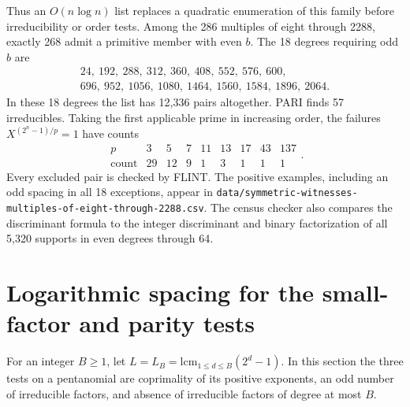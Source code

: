 \documentclass[11pt]{article}
\begin{document}
Thus an \(O(n\log n)\) list replaces a quadratic enumeration of this
family before irreducibility or order tests. Among the 286 multiples
of eight through 2288, exactly 268 admit a primitive member with even
\(b\). The 18 degrees requiring odd \(b\) are
\[
\begin{gathered}
24,\ 192,\ 288,\ 312,\ 360,\ 408,\ 552,\ 576,\ 600,\\
696,\ 952,\ 1056,\ 1080,\ 1464,\ 1560,\ 1584,\ 1896,\ 2064 .
\end{gathered}
\]
In these 18 degrees the list has 12,336 pairs altogether. PARI finds
57 irreducibles. Taking the first applicable prime in increasing
order, the failures \(X^{(2^n-1)/p}=1\) have counts
\[
 \begin{array}{r|rrrrrrrr}p&3&5&7&11&13&17&43&137\\\hline
  \text{count}&29&12&9&1&3&1&1&1\end{array}.
\]
Every excluded pair is checked by FLINT. The positive examples,
including an odd spacing in all 18 exceptions, appear in
\nolinkurl{data/symmetric-witnesses-multiples-of-eight-through-2288.csv}.
The census checker also compares the discriminant formula to the
integer discriminant and binary factorization of all 5,320 supports
in even degrees through 64.

\section{Logarithmic spacing for the small-factor and parity tests}
\label{sec:complementary-local}
For an integer \(B\ge1\), let \(L=L_B=\mathrm{lcm}_{1\le d\le B}(2^d-1)\).
In this section the three tests on a pentanomial are coprimality of
its positive exponents, an odd number of irreducible factors, and
absence of irreducible factors of degree at most \(B\).
\end{document}

